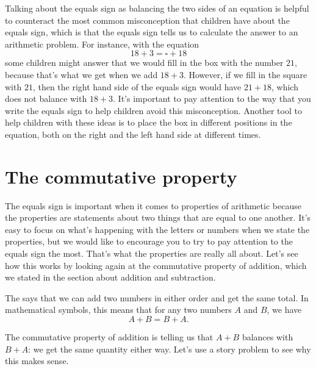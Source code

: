 \documentclass{ximera}
\begin{document}
Talking about the equals sign as balancing the two sides of an equation is helpful to counteract the most common misconception that children have about the equals sign, which is that the equals sign tells us to calculate the answer to an arithmetic problem. For instance, with the equation
\[
18 + 3 = \square + 18
\]
some children might answer that we would fill in the box with the number $21$, because that's what we get when we add $18 + 3$. However, if we fill in the square with $21$, then the right hand side of the equals sign would have $21 + 18$, which does not balance with $18 + 3$. It's important to pay attention to the way that you write the equals sign to help children avoid this misconception. Another tool to help children with these ideas is to place the box in different positions in the equation, both on the right and the left hand side at different times.




\section{The commutative property}

The equals sign is important when it comes to properties of arithmetic because the properties are statements about two things that are equal to one another. It's easy to focus on what's happening with the letters or numbers when we state the properties, but we would like to encourage you to try to pay attention to the equals sign the most. That's what the properties are really all about. Let's see how this works by looking again at the commutative property of addition, which we stated in the section about addition and subtraction.

\begin{definition}
The  says that we can add two numbers in either order and get the same total. In mathematical symbols, this means that for any two numbers $A$ and $B$, we have
\[
A + B = B + A.
\]
\end{definition}

The commutative property of addition is telling us that $A+B$ balances with $B+A$: we get the same quantity either way. Let's use a story problem to see why this makes sense. 
\end{document}
